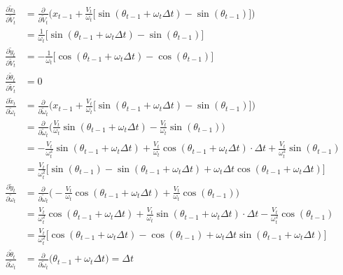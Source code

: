 \documentclass{article}
\begin{document}
\begin{enumerate}[label=(\roman*)]
\begin{equation}
\begin{aligned}
\frac{\partial \tilde x_t}{\partial \tilde V_t}
&= \frac{\partial}{\partial \tilde V_t} \Bigg( x_{t-1} + \frac{V_t}{\omega_t} \Big[ \sin(\theta_{t-1} + \omega_t\Delta t) - \sin(\theta_{t-1}) \Big] \Bigg) \\
&= \frac{1}{\omega_t} \Big[ \sin(\theta_{t-1} + \omega_t\Delta t) - \sin(\theta_{t-1}) \Big]
\\
\frac{\partial \tilde y_t}{\partial \tilde V_t}
&= -\frac{1}{\omega_t} \Big[ \cos(\theta_{t-1} + \omega_t\Delta t) - \cos(\theta_{t-1}) \Big]
\\
\frac{\partial \tilde \theta_t}{\partial \tilde V_t} &= 0
\\
\frac{\partial \tilde x_t}{\partial \tilde \omega_t}
&= \frac{\partial}{\partial \tilde \omega_t} \Bigg( x_{t-1} + \frac{V_t}{\omega_t} \Big[ \sin(\theta_{t-1} + \omega_t\Delta t) - \sin(\theta_{t-1}) \Big] \Bigg) \\
&= \frac{\partial}{\partial \tilde \omega_t} \Bigg( \frac{V_t}{\omega_t}\sin(\theta_{t-1} + \omega_t\Delta t) - \frac{V_t}{\omega_t}\sin(\theta_{t-1}) \Bigg) \\
&= -\frac{V_t}{\omega_t^2} \sin(\theta_{t-1} + \omega_t\Delta t) + \frac{V_t}{\omega_t}\cos(\theta_{t-1} + \omega_t\Delta t) \cdot \Delta t + \frac{V_t}{\omega_t^2}\sin(\theta_{t-1}) \\
&= \frac{V_t}{\omega_t^2} \Big [ \sin(\theta_{t-1}) - \sin(\theta_{t-1} + \omega_t\Delta t) + \omega_t \Delta t \cos(\theta_{t-1} + \omega_t\Delta t) \Big]
\\
\frac{\partial \tilde y_t}{\partial \tilde \omega_t}
&= \frac{\partial}{\partial \tilde \omega_t} \Bigg( -\frac{V_t}{\omega_t}\cos(\theta_{t-1} + \omega_t\Delta t) + \frac{V_t}{\omega_t}\cos(\theta_{t-1}) \Bigg) \\
&= \frac{V_t}{\omega_t^2}\cos(\theta_{t-1} + \omega_t\Delta t) + \frac{V_t}{\omega_t}\sin(\theta_{t-1} + \omega_t\Delta t) \cdot \Delta t - \frac{V_t}{\omega_t^2}\cos(\theta_{t-1}) \\
&= \frac{V_t}{\omega_t^2} \Big [ \cos(\theta_{t-1} + \omega_t\Delta t) - \cos(\theta_{t-1}) + \omega_t \Delta t \sin(\theta_{t-1} + \omega_t\Delta t) \Big]
\\
\frac{\partial \tilde \theta_t}{\partial \tilde \omega_t}
&= \frac{\partial}{\partial \tilde \omega_t} \Bigg( \theta_{t-1} + \omega_t \Delta t \Bigg) = \Delta t
\end{aligned}
\end{equation}


\end{enumerate}
\end{document}
